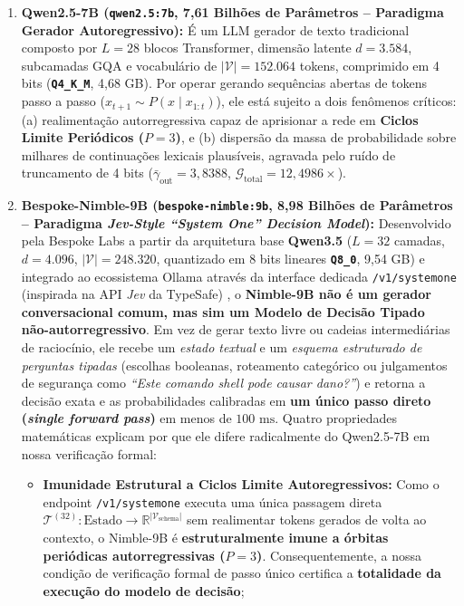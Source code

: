 \documentclass[11pt,a4paper]{article}
\theoremstyle{definition}
\begin{document}
\begin{enumerate}
    \item \textbf{Qwen2.5-7B (\texttt{qwen2.5:7b}, 7,61 Bilhões de Parâmetros -- Paradigma Gerador Autoregressivo):} É um LLM gerador de texto tradicional composto por $L = 28$ blocos Transformer, dimensão latente $d = 3.584$, subcamadas GQA e vocabulário de $|\mathcal{V}| = 152.064$ tokens, comprimido em 4 bits (\textbf{\texttt{Q4\_K\_M}}, 4,68 GB). Por operar gerando sequências abertas de tokens passo a passo ($x_{t+1} \sim P(x \mid x_{1:t})$), ele está sujeito a dois fenômenos críticos: (a) realimentação autorregressiva capaz de aprisionar a rede em \textbf{Ciclos Limite Periódicos ($P=3$)}, e (b) dispersão da massa de probabilidade sobre milhares de continuações lexicais plausíveis, agravada pelo ruído de truncamento de 4 bits ($\bar{\gamma}_{\text{out}} = 3{,}8388$, $\mathcal{G}_{\text{total}} = 12{,}4986\times$).
    \item \textbf{Bespoke-Nimble-9B (\texttt{bespoke-nimble:9b}, 8,98 Bilhões de Parâmetros -- Paradigma \textit{Jev-Style ``System One'' Decision Model}):} Desenvolvido pela Bespoke Labs a partir da arquitetura base \textbf{Qwen3.5} ($L = 32$ camadas, $d = 4.096$, $|\mathcal{V}| = 248.320$, quantizado em 8 bits lineares \textbf{\texttt{Q8\_0}}, 9,54 GB) e integrado ao ecossistema Ollama através da interface dedicada \texttt{/v1/systemone} (inspirada na API \textit{Jev} da TypeSafe) \cite{ollama_jev2026}, o \textbf{Nimble-9B não é um gerador conversacional comum, mas sim um Modelo de Decisão Tipado não-autorregressivo}. Em vez de gerar texto livre ou cadeias intermediárias de raciocínio, ele recebe um \textit{estado textual} e um \textit{esquema estruturado de perguntas tipadas} (escolhas booleanas, roteamento categórico ou julgamentos de segurança como \textit{``Este comando shell pode causar dano?''}) e retorna a decisão exata e as probabilidades calibradas em \textbf{um único passo direto (\textit{single forward pass})} em menos de $100\text{ ms}$. Quatro propriedades matemáticas explicam por que ele difere radicalmente do Qwen2.5-7B em nossa verificação formal:
    \begin{itemize}
        \item \textbf{Imunidade Estrutural a Ciclos Limite Autoregressivos:} Como o endpoint \texttt{/v1/systemone} executa uma única passagem direta $\mathcal{T}^{(32)}: \text{Estado} \to \mathbb{R}^{|\mathcal{V}_{\text{schema}}|}$ sem realimentar tokens gerados de volta ao contexto, o Nimble-9B é \textbf{estruturalmente imune a órbitas periódicas autorregressivas ($P=3$)}. Consequentemente, a nossa condição de verificação formal de passo único certifica a \textbf{totalidade da execução do modelo de decisão};

\end{itemize}
\end{enumerate}
\end{document}
